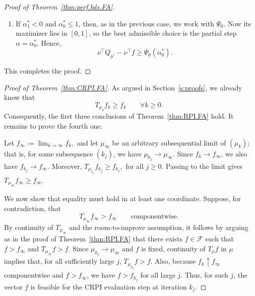 \documentclass[twoside]{article}
\theoremstyle{plain}
\theoremstyle{definition}
\theoremstyle{remark}
\newcommand{\tr}{\top}
\newcommand{\mup}{\mu'}
\newcommand{\alS}{\alpha^*}
\newcommand{\cF}{\mathcal{F}}
\begin{document}
\begin{proof}[Proof of Theorem~\ref{thm:perf.bds.FA}]
\begin{enumerate}
    \item If \(\alS_1 < 0\) and \(\alS_0 \le 1\), then, as in the previous case, we work with \(\Psi_0\). Now its maximizer lies in \([0,1]\), so the best admissible choice is the partial step \(\alpha=\alS_0\). Hence,
    \[
        \nu^\tr Q_{\mup} - \nu^\tr f \ge \Psi_0(\alS_0).
    \]
\end{enumerate}
This completes the proof.
\end{proof}

\begin{proof}[Proof of Theorem~\ref{thm:CRPI.FA}]
As argued in Section~\ref{s:proofs}, we already know that
\[
    T_{\mu_k} f_k \ge f_k \qquad \forall k \ge 0.
\]
Consequently, the first three conclusions of Theorem~\ref{thm:RPI.FA} hold. It remains to prove the fourth one.

Let $f_\infty := \lim_{k\to\infty} f_k,$ and let \(\mu_\infty\) be an arbitrary subsequential limit of \((\mu_k)\); that is, for some subsequence \((k_j)\), we have $\mu_{k_j} \to \mu_\infty.$  Since \(f_k \to f_\infty\), we also have \(f_{k_j} \to f_\infty\). Moreover, $T_{\mu_{k_j}} f_{k_j} \ge f_{k_j},$ for all $j \geq 0.$ Passing to the limit gives $T_{\mu_\infty} f_\infty \ge f_\infty.$ 

We now show that equality must hold in at least one coordinate. Suppose, for contradiction, that
\begin{equation}
\label{eq:strict.CRPI}
    T_{\mu_\infty} f_\infty > f_\infty
    \qquad\text{componentwise.}
\end{equation}
By continuity of \(T_{\mu_\infty}\) and the room-to-improve assumption, it follows by arguing as in the proof of Theorem~\ref{thm:RPI.FA} that there exists \(f \in \cF\) such that $f > f_\infty$ and $T_{\mu_\infty} f > f.$ Since \(\mu_{k_j} \to \mu_\infty\) and \(f\) is fixed, continuity of \(T_\mu f\) in \(\mu\) implies that, for all sufficiently large \(j\), $T_{\mu_{k_j}} f > f.$ Also, because \(f_k \uparrow f_\infty\) componentwise and \(f > f_\infty\), we have \(f > f_{k_j}\) for all large \(j\). Thus, for such \(j\), the vector \(f\) is feasible for the CRPI evaluation step at iteration \(k_j\).


\end{proof}
\end{document}
